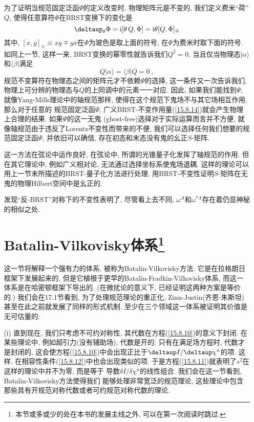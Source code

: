 为了证明当规范固定泛函$\Psi $的定义改变时, 物理矩阵元是不变的, 我们定义费米``荷'' $Q$, 使得任意算符$\Phi $在BRST变换下的变化是
\begin{equation}
\deltaup_{\theta}\Phi = \mi [\theta\,Q , \Phi] = \mi \theta [Q, \Phi]_{\mp} \label{15.8.20}
\end{equation}
其中, $[x,y]_{\mp }\equiv xy\mp yx$在$\Phi$为玻色是取上面的符号, 在$\Phi$为费米时取下面的符号. 如同上一节, 这样一来, BRST变换的幂零性就告诉我们$Q^{2}=0$.
当且仅当物理态$|\alpha \rangle $和$\langle \beta |$满足
\begin{equation}
Q \vert\alpha \rangle = \langle \beta \vert Q = 0  \:,  \label{15.8.21}
\end{equation}
规范不变算符在物理态之间的矩阵元才不依赖$\Psi $的选择, 这一条件又一次告诉我们, 物理上可分辨的物理态与$Q$的上同调中的元素一一对应. 
因此, 如果我们能找到{}$\Psi $, 就像Yang-Mills理论中的轴规范那样, 使得在这个规范下鬼场不与其它场相互作用, 那么对于任意的%
规范固定泛函$\Psi $, 广义BRST-不变作用量(\ref{15.8.14})就会产生物理上合理的结果. 如果$\Psi $的这一无鬼%
(ghost-free)选择对于实际运算而言并不方便, 就像轴规范由于违反了Lorentz不变性而带来的不便, 我们可以选择任何我们想要的规范固定泛函$\Psi $, 
并依旧可以确信, 存在初态和末态没有鬼的幺正$S$-矩阵.

这一方法在弦论中运作良好, 在弦论中, 所谓的光锥量子化发挥了轴规范的作用. 但在其它理论中, 例如广义相对论, 无法通过选择坐标系使鬼场退耦. 
这样的理论可以用上一节末所描述的BRST-量子化方法进行处理, 用BRST-不变性证明$S$-矩阵在无鬼的物理Hilbert空间中是幺正的.

发现\cite{17}``反-BRST''对称\cite{18}下的不变性表明了, 尽管看上去不同, $\omega ^{A}$和$\omega ^{\ast A}$存在着仍显神秘的相似之处.


\section[Batalin-Vilkovisky体系]{Batalin-Vilkovisky体系\footnote{本节或多或少的处在本书的发展主线之外, 可以在第一次阅读时跳过.}}

这一节将解释一个强有力的体系, 被称为Batalin-Vilkovisky\cite{19}方法. 它是在拉格朗日框架下发展起来的, 
但是它植根于更早的Batalin-Fradkin-Vilkovisky体系,\cite{20} 而这一体系是在哈密顿框架下导出的. (在微扰论的意义下, 
已经证明这两种方案是等价的.\cite{21}) 我们会在17.1节看到, 为了处理规范理论的重正化, Zinn-Justin\cite{22}(齐恩-朱斯坦)甚至在此之前就发展了同样的形式机制. 
至少在三个领域这一体系被证明其价值是无可估量的:

\noindent (i)  直到现在, 我们只考虑不可约对称性, 其代数在方程(\ref{15.8.10})的意义下封闭. 在某些理论中, 例如超引力(没有辅助场)\cite{23}, 代数是开的: 
只有在满足场方程时, 代数才是封闭的, 这会使方程(\ref{15.8.10})中会出现正比于$\deltaup I/\deltaup \chi ^{n}$的项. 这样, 
在相容性条件(\ref{15.8.12})中也会出现类似的项. 于是方程(\ref{15.8.11})就表明了$s^{2}$在这样的理论中并不为零, 而是等于%
导数$\delta I/\delta \chi ^{n}$的线性组合. 我们会在这一节看到, Batalin-Vilkovisky方法使得我们%
能够处理非常宽泛的规范理论, 这些理论中包含那些具有开规范对称代数或者可约规范对称代数的理论.

